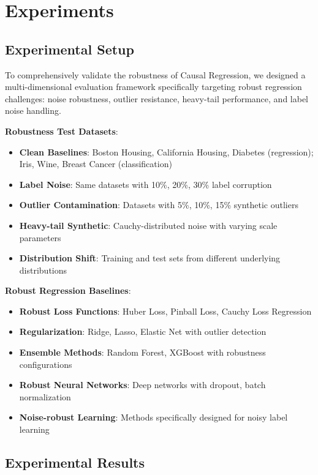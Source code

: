 \documentclass[conference]{IEEEtran}
\begin{document}
\section{Experiments}
\label{sec:experiments}

\subsection{Experimental Setup}

To comprehensively validate the robustness of Causal Regression, we designed a multi-dimensional evaluation framework specifically targeting robust regression challenges: noise robustness, outlier resistance, heavy-tail performance, and label noise handling.

\textbf{Robustness Test Datasets}:
\begin{itemize}
\item \textbf{Clean Baselines}: Boston Housing, California Housing, Diabetes (regression); Iris, Wine, Breast Cancer (classification)
\item \textbf{Label Noise}: Same datasets with 10\%, 20\%, 30\% label corruption
\item \textbf{Outlier Contamination}: Datasets with 5\%, 10\%, 15\% synthetic outliers
\item \textbf{Heavy-tail Synthetic}: Cauchy-distributed noise with varying scale parameters
\item \textbf{Distribution Shift}: Training and test sets from different underlying distributions
\end{itemize}

\textbf{Robust Regression Baselines}:
\begin{itemize}
\item \textbf{Robust Loss Functions}: Huber Loss, Pinball Loss, Cauchy Loss Regression
\item \textbf{Regularization}: Ridge, Lasso, Elastic Net with outlier detection
\item \textbf{Ensemble Methods}: Random Forest, XGBoost with robustness configurations
\item \textbf{Robust Neural Networks}: Deep networks with dropout, batch normalization
\item \textbf{Noise-robust Learning}: Methods specifically designed for noisy label learning
\end{itemize}

\subsection{Experimental Results}
\end{document}
